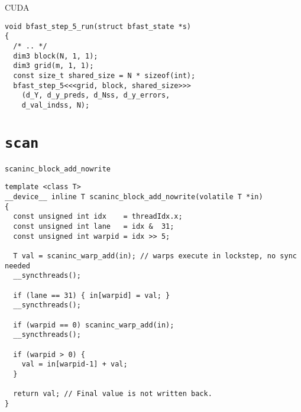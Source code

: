 %


\begin{frame}[fragile]{CUDA}

\begin{verbatim}
void bfast_step_5_run(struct bfast_state *s)
{
  /* .. */
  dim3 block(N, 1, 1);
  dim3 grid(m, 1, 1);
  const size_t shared_size = N * sizeof(int);
  bfast_step_5<<<grid, block, shared_size>>>
    (d_Y, d_y_preds, d_Nss, d_y_errors,
    d_val_indss, N);
\end{verbatim}

\end{frame}


\section{\texttt{scan}} 

\begin{frame}[fragile]{\texttt{scaninc\_block\_add\_nowrite}}
\begin{verbatim}
template <class T>
__device__ inline T scaninc_block_add_nowrite(volatile T *in)
{
  const unsigned int idx    = threadIdx.x;
  const unsigned int lane   = idx &  31;
  const unsigned int warpid = idx >> 5;

  T val = scaninc_warp_add(in); // warps execute in lockstep, no sync needed
  __syncthreads();

  if (lane == 31) { in[warpid] = val; }
  __syncthreads();

  if (warpid == 0) scaninc_warp_add(in);
  __syncthreads();

  if (warpid > 0) {
    val = in[warpid-1] + val;
  }

  return val; // Final value is not written back.
}
\end{verbatim}
\end{frame}

